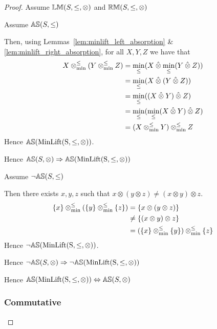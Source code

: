 \documentclass[../Summary.tex]{subfiles}
\begin{document}
\begin{proof}
Assume ${\mathbb{LM}}(S,\leq,\otimes)$ and ${\mathbb{RM}}(S,\leq,\otimes)$

Assume ${\mathbb{AS}}(S,\leq)$
\begin{ind}
Then, using Lemmas~\ref{lem:minlift_left_absorption} \& \ref{lem:minlift_right_absorption}, for all $X,Y,Z$ we have that
\begin{align*}
X \mathbin{\otimes_{\min}^{\leq}} (Y \mathbin{\otimes_{\min}^{\leq}} Z) 	& = \min_\leq(X \mathbin{\hat{\otimes}} \min_\leq(Y \mathbin{\hat{\otimes}} Z)) \\
							& = \min_\leq(X \mathbin{\hat{\otimes}} (Y \mathbin{\hat{\otimes}} Z)) \\
							& = \min_\leq((X \mathbin{\hat{\otimes}} Y) \mathbin{\hat{\otimes}} Z) \\
							& = \min_\leq(\min_\leq(X \mathbin{\hat{\otimes}} Y) \mathbin{\hat{\otimes}} Z) \\
							& = (X \mathbin{\otimes_{\min}^{\leq}} Y) \mathbin{\otimes_{\min}^{\leq}} Z
\end{align*}
Hence ${\mathbb{AS}}(\mathrm{MinLift(S,\leq,\otimes)})$.
\end{ind}
Hence ${\mathbb{AS}}(S,\otimes) \Rightarrow {\mathbb{AS}}(\mathrm{MinLift(S,\leq,\otimes)})$

\vspace{2em}


Assume $\neg {\mathbb{AS}}(S,\leq)$

\begin{ind}
Then there exists $x,y,z$ such that $x \otimes (y \otimes z) \neq (x \otimes y) \otimes z$.
\begin{align*}
\{ x \} \mathbin{\otimes_{\min}^{\leq}} (\{ y \} \mathbin{\otimes_{\min}^{\leq}} \{ z \}) 	& = \{x \otimes (y \otimes z)\} \\	
												& \neq \{ (x \otimes y) \otimes z \} \\
												& = (\{ x \} \mathbin{\otimes_{\min}^{\leq}} \{ y \}) \mathbin{\otimes_{\min}^{\leq}} \{ z \}
\end{align*}
Hence $\neg {\mathbb{AS}}(\mathrm{MinLift(S,\leq,\otimes)})$.
\end{ind}
Hence $\neg {\mathbb{AS}}(S,\otimes) \Rightarrow \neg {\mathbb{AS}}(\mathrm{MinLift(S,\leq,\otimes)})$

\vspace{2em}

Hence ${\mathbb{AS}}(\mathrm{MinLift(S,\leq,\otimes)}) \Leftrightarrow {\mathbb{AS}}(S,\otimes)$





\subsubsection{Commutative}


\end{proof}
\end{document}
